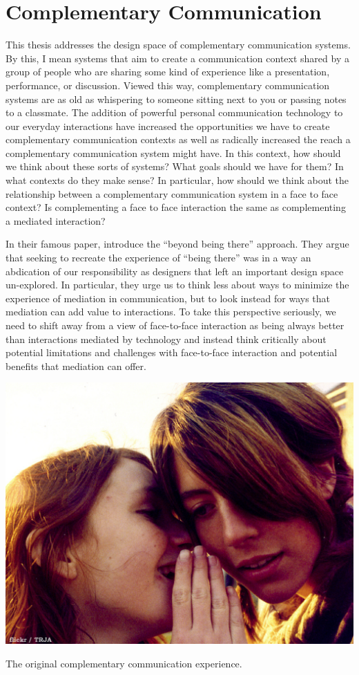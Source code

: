 \section{Complementary Communication}
This thesis addresses the design space of complementary communication systems. By this, I mean systems that aim to create a communication context shared by a group of people who are sharing some kind of experience like a presentation, performance, or discussion. Viewed this way, complementary communication systems are as old as whispering to someone sitting next to you or passing notes to a classmate. The addition of powerful personal communication technology to our everyday interactions have increased the opportunities we have to create complementary communication contexts as well as radically increased the reach a complementary communication system might have. In this context, how should we think about these sorts of systems? What goals should we have for them? In what contexts do they make sense? In particular, how should we think about the relationship between a complementary communication system in a face to face context? Is complementing a face to face interaction the same as complementing a mediated interaction?


In their famous paper, \citet{Hollan:1992tz} introduce the ``beyond being there'' approach. They argue that seeking to recreate the experience of ``being there'' was in a way an abdication of our responsibility as designers that left an important design space un-explored. In particular, they urge us to think less about ways to minimize the experience of mediation in communication, but to look instead for ways that mediation can add value to interactions. To take this perspective seriously, we need to shift away from a view of face-to-face interaction as being always better than interactions mediated by technology and instead think critically about potential limitations and challenges with face-to-face interaction and potential benefits that mediation can offer. 

\begin{marginfigure}
	\includegraphics{figures/whisper.png}
	\caption{The original complementary communication experience.}
	\label{fig:whisper}
\end{marginfigure}


